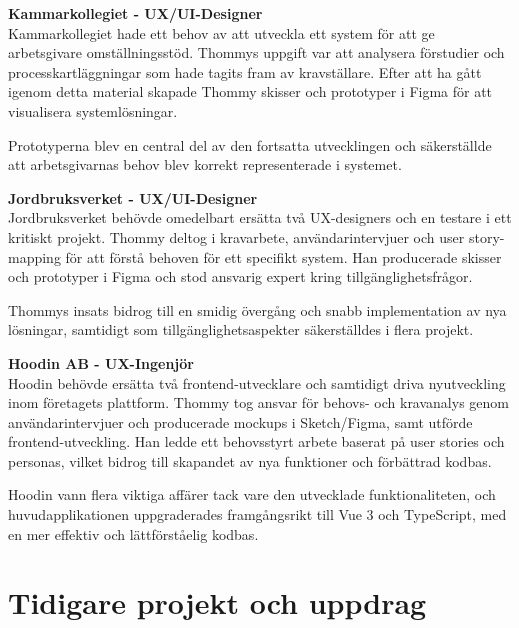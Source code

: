 \documentclass[a4paper,10pt]{article}
\begin{document}
\textbf{Kammarkollegiet - UX/UI-Designer}\\
Kammarkollegiet hade ett behov av att utveckla ett system för att ge arbetsgivare omställningsstöd. Thommys uppgift var att analysera förstudier och processkartläggningar som hade tagits fram av kravställare. Efter att ha gått igenom detta material skapade Thommy skisser och prototyper i Figma för att visualisera systemlösningar. 

Prototyperna blev en central del av den fortsatta utvecklingen och säkerställde att arbetsgivarnas behov blev korrekt representerade i systemet.

\vspace{0.3cm}

\textbf{Jordbruksverket - UX/UI-Designer}\\
Jordbruksverket behövde omedelbart ersätta två UX-designers och en testare i ett kritiskt projekt. Thommy deltog i kravarbete, användarintervjuer och user story-mapping för att förstå behoven för ett specifikt system. Han producerade skisser och prototyper i Figma och stod ansvarig expert kring tillgänglighetsfrågor.

Thommys insats bidrog till en smidig övergång och snabb implementation av nya lösningar, samtidigt som tillgänglighetsaspekter säkerställdes i flera projekt.

\vspace{0.3cm}

\textbf{Hoodin AB - UX-Ingenjör}\\
Hoodin behövde ersätta två frontend-utvecklare och samtidigt driva nyutveckling inom företagets plattform. Thommy tog ansvar för behovs- och kravanalys genom användarintervjuer och producerade mockups i Sketch/Figma, samt utförde frontend-utveckling. Han ledde ett behovsstyrt arbete baserat på user stories och personas, vilket bidrog till skapandet av nya funktioner och förbättrad kodbas.

\vspace{0.3cm}

Hoodin vann flera viktiga affärer tack vare den utvecklade funktionaliteten, och huvudapplikationen uppgraderades framgångsrikt till Vue 3 och TypeScript, med en mer effektiv och lättförståelig kodbas.

\vspace{0.5cm}

\section*{Tidigare projekt och uppdrag}
\end{document}
